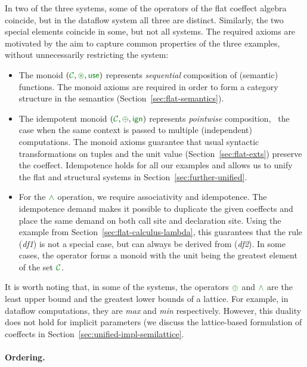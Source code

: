 \noindent
In two of the three systems, some of the operators of the flat coeffect algebra coincide, but
in the dataflow system all three are distinct. Similarly, the two special elements
coincide in some, but not all systems. The required axioms are motivated by the aim to capture
common properties of the three examples, without unnecessarily restricting the system:

\begin{itemize}
\item The monoid $(\C, \cseq, \cunit)$ represents \emph{sequential} composition of (semantic)
functions. The monoid axioms are required in order to form a category structure in the
semantics (Section~\ref{sec:flat-semantics}).

\item The idempotent monoid $(\C, \cpar, \czero)$ represents \emph{pointwise} composition,
\ie~the case when the same context is passed to multiple (independent) computations. The monoid
axioms guarantee that usual syntactic transformations on tuples and the unit value
(Section~\ref{sec:flat-exts}) preserve the coeffect. Idempotence holds for all our examples
and allows us to unify the flat and structural systems in Section~\ref{sec:further-unified}.

\item For the $\czip$ operation, we require associativity and idempotence. The idempotence
demand makes it possible to duplicate the given coeffects and place the same demand on both
call site and declaration site. Using the example from Section~\ref{sec:flat-calculus-lambda},
this guarantees that the rule (\emph{df1}) is not a special case, but can always be derived
from (\emph{df2}). In some cases, the operator forms a monoid with the unit being the greatest
element of the set $\C$.
\end{itemize}

\noindent
It is worth noting that, in some of the systems, the operators $\cpar$ and $\czip$ are the least
upper bound and the greatest lower bounds of a lattice. For example, in dataflow computations, they
are \emph{max} and \emph{min} respectively. However, this duality does not hold for implicit parameters
(we discuss the lattice-based formulation of coeffects in Section~\ref{sec:unified-impl-semilattice}.

\paragraph{Ordering.}

